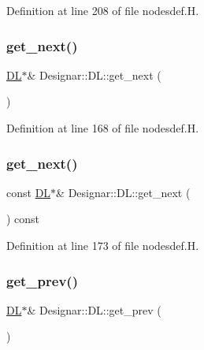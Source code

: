 Definition at line 208 of file nodesdef.\+H.

\mbox{\label{class_designar_1_1_d_l_a9ba5385743ae2c266ea51dcb05f79803}} 
\subsubsection{\texorpdfstring{get\+\_\+next()}{get\_next()}\hspace{0.1cm}{\footnotesize\ttfamily [1/2]}}
{\footnotesize\ttfamily \hyperlink{class_designar_1_1_d_l}{DL}$\ast$\& Designar\+::\+D\+L\+::get\+\_\+next (\begin{DoxyParamCaption}{ }\end{DoxyParamCaption})\hspace{0.3cm}{\ttfamily [inline]}}



Definition at line 168 of file nodesdef.\+H.

\mbox{\label{class_designar_1_1_d_l_ad95ed8f7db042ad4f537b335e8b77772}} 
\subsubsection{\texorpdfstring{get\+\_\+next()}{get\_next()}\hspace{0.1cm}{\footnotesize\ttfamily [2/2]}}
{\footnotesize\ttfamily const \hyperlink{class_designar_1_1_d_l}{DL}$\ast$\& Designar\+::\+D\+L\+::get\+\_\+next (\begin{DoxyParamCaption}{ }\end{DoxyParamCaption}) const\hspace{0.3cm}{\ttfamily [inline]}}



Definition at line 173 of file nodesdef.\+H.

\mbox{\label{class_designar_1_1_d_l_a479355d41d2d7085b33342a14c0ca514}} 
\subsubsection{\texorpdfstring{get\+\_\+prev()}{get\_prev()}\hspace{0.1cm}{\footnotesize\ttfamily [1/2]}}
{\footnotesize\ttfamily \hyperlink{class_designar_1_1_d_l}{DL}$\ast$\& Designar\+::\+D\+L\+::get\+\_\+prev (\begin{DoxyParamCaption}{ }\end{DoxyParamCaption})\hspace{0.3cm}{\ttfamily [inline]}}



